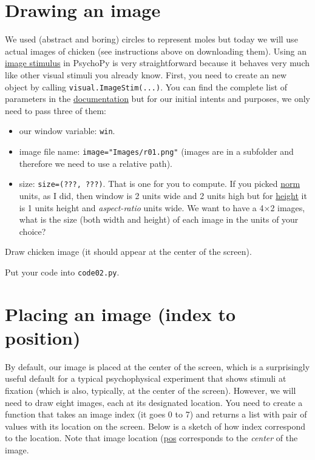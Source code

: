 \documentclass[
]{book}
\providecommand{\tightlist}{%
  \setlength{\itemsep}{0pt}\setlength{\parskip}{0pt}}
\begin{document}
\hypertarget{imagestim}{%
\section{Drawing an image}\label{imagestim}}

We used (abstract and boring) circles to represent moles but today we will use actual images of chicken (see instructions above on downloading them). Using an \href{https://psychopy.org/api/visual/imagestim.html}{image stimulus} in PsychoPy is very straightforward because it behaves very much like other visual stimuli you already know. First, you need to create an new object by calling \texttt{visual.ImageStim(...)}. You can find the complete list of parameters in the \href{(https://psychopy.org/api/visual/imagestim.html)}{documentation} but for our initial intents and purposes, we only need to pass three of them:

\begin{itemize}
\tightlist
\item
  our window variable: \texttt{win}.
\item
  image file name: \texttt{image="Images/r01.png"} (images are in a subfolder and therefore we need to use a relative path).
\item
  size: \texttt{size=(???,\ ???)}. That is one for you to compute. If you picked \protect\hyperlink{psychopy-units-norm}{norm} units, as I did, then window is 2 units wide and 2 units high but for \protect\hyperlink{psychopy-units-height}{height} it is 1 units height and \emph{aspect-ratio} units wide. We want to have a 4×2 images, what is the size (both width and height) of each image in the units of your choice?
\end{itemize}

Draw chicken image (it should appear at the center of the screen).

Put your code into \texttt{code02.py}.

\hypertarget{placing-an-image-index-to-position}{%
\section{Placing an image (index to position)}\label{placing-an-image-index-to-position}}

By default, our image is placed at the center of the screen, which is a surprisingly useful default for a typical psychophysical experiment that shows stimuli at fixation (which is also, typically, at the center of the screen). However, we will need to draw eight images, each at its designated location. You need to create a function that takes an image index (it goes 0 to 7) and returns a list with pair of values with its location on the screen. Below is a sketch of how index correspond to the location. Note that image location (\href{https://psychopy.org/api/visual/imagestim.html\#psychopy.visual.ImageStim.pos\%20attribute}{pos} corresponds to the \emph{center} of the image.
\end{document}

